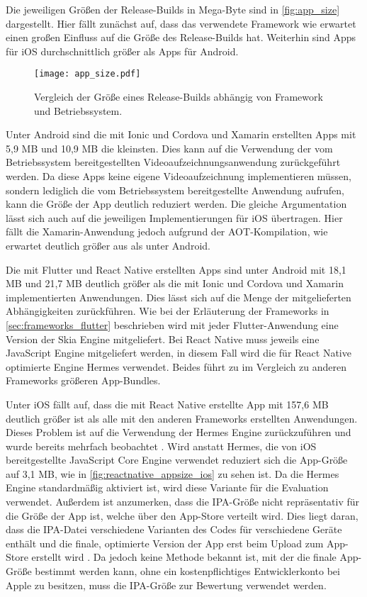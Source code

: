 Die jeweiligen Größen der Release-Builds in Mega-Byte sind in \autoref{fig:app_size} dargestellt.
Hier fällt zunächst auf, dass das verwendete Framework wie erwartet einen großen Einfluss auf die Größe des Release-Builds hat.
Weiterhin sind Apps für iOS durchschnittlich größer als Apps für Android.
\begin{figure}[ht]
  \centering 
  \texttt{[image: app\_size.pdf]}
  \caption{Vergleich der Größe eines Release-Builds abhängig von Framework und Betriebssystem.}
  \label{fig:app_size}
\end{figure}
Unter Android sind die mit Ionic und Cordova und Xamarin erstellten Apps mit 5,9 MB und 10,9 MB die kleinsten.
Dies kann auf die Verwendung der vom Betriebssystem bereitgestellten Videoaufzeichnungsanwendung zurückgeführt werden.
Da diese Apps keine eigene Videoaufzeichnung implementieren müssen, sondern lediglich die vom Betriebssystem bereitgestellte Anwendung aufrufen, kann die Größe der App deutlich reduziert werden.
Die gleiche Argumentation lässt sich auch auf die jeweiligen Implementierungen für iOS übertragen.
Hier fällt die Xamarin-Anwendung jedoch aufgrund der \ac{AOT}-Kompilation, wie erwartet deutlich größer aus als unter Android.

Die mit Flutter und React Native erstellten Apps sind unter Android mit 18,1 MB und 21,7 MB deutlich größer als die mit Ionic und Cordova und Xamarin implementierten Anwendungen.
Dies lässt sich auf die Menge der mitgelieferten Abhängigkeiten zurückführen.
Wie bei der Erläuterung der Frameworks in \autoref{sec:frameworks_flutter} beschrieben wird mit jeder Flutter-Anwendung eine Version der Skia Engine mitgeliefert.
Bei React Native muss jeweils eine JavaScript Engine mitgeliefert werden, in diesem Fall wird die für React Native optimierte Engine Hermes verwendet.
Beides führt zu im Vergleich zu anderen Frameworks größeren App-Bundles.

Unter iOS fällt auf, dass die mit React Native erstellte App mit 157,6 MB deutlich größer ist als alle mit den anderen Frameworks erstellten Anwendungen.
Dieses Problem ist auf die Verwendung der Hermes Engine zurückzuführen und wurde bereits mehrfach beobachtet \cite{Hermes_appsize,Hermes_appsize_2}.
Wird anstatt Hermes, die von iOS bereitgestellte JavaScript Core Engine verwendet reduziert sich die App-Größe auf 3,1 MB, wie in \autoref{fig:reactnative_appsize_ios} zu sehen ist.
Da die Hermes Engine standardmäßig aktiviert ist, wird diese Variante für die Evaluation verwendet.
Außerdem ist anzumerken, dass die \ac{IPA}-Größe nicht repräsentativ für die Größe der App ist, welche über den App-Store verteilt wird.
Dies liegt daran, dass die \ac{IPA}-Datei verschiedene Varianten des Codes für verschiedene Geräte enthält und die finale, optimierte Version der App erst beim Upload zum App-Store erstellt wird \cite{IPA_Size}.
Da jedoch keine Methode bekannt ist, mit der die finale App-Größe bestimmt werden kann, ohne ein kostenpflichtiges Entwicklerkonto bei Apple zu besitzen, muss die \ac{IPA}-Größe zur Bewertung verwendet werden.

